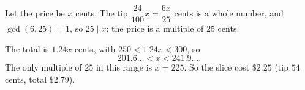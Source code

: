 Let the price be $x$ cents. The tip $\dfrac{24}{100}x=\dfrac{6x}{25}$ cents is a whole number, and $\gcd(6,25)=1$, so $25\mid x$: the price is a multiple of $25$ cents.

The total is $1.24x$ cents, with $250<1.24x<300$, so
\[
201.6\ldots<x<241.9\ldots .
\]
The only multiple of $25$ in this range is $x=225$. So the slice cost $\boxed{\$2.25}$ (tip $54$ cents, total $\$2.79$).
